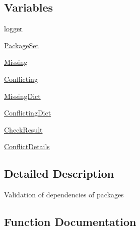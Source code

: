 \subsection*{Variables}
\begin{DoxyCompactItemize}
\item 
\hyperlink{namespacepip_1_1__internal_1_1operations_1_1check_ae884318312138e6f7ab45bd1d45180d7}{logger}
\item 
\hyperlink{namespacepip_1_1__internal_1_1operations_1_1check_a772274a200eddcd0a3574e45e825c1e4}{Package\+Set}
\item 
\hyperlink{namespacepip_1_1__internal_1_1operations_1_1check_aca51bd22558103df3ace175abcb0e024}{Missing}
\item 
\hyperlink{namespacepip_1_1__internal_1_1operations_1_1check_a6e1d711030dfddbacc38304bfc8ef87a}{Conflicting}
\item 
\hyperlink{namespacepip_1_1__internal_1_1operations_1_1check_a36e097c8c839760cdb999e39b799944c}{Missing\+Dict}
\item 
\hyperlink{namespacepip_1_1__internal_1_1operations_1_1check_a5b777bebebaee1d9c6751c1b639b72f4}{Conflicting\+Dict}
\item 
\hyperlink{namespacepip_1_1__internal_1_1operations_1_1check_acd52e1ca33b255f0f9a8b19883a9c7f4}{Check\+Result}
\item 
\hyperlink{namespacepip_1_1__internal_1_1operations_1_1check_a83b303238632b9b573cd69697b9a45e3}{Conflict\+Details}
\end{DoxyCompactItemize}


\subsection{Detailed Description}
\begin{DoxyVerb}Validation of dependencies of packages
\end{DoxyVerb}
 

\subsection{Function Documentation}
\mbox{\label{namespacepip_1_1__internal_1_1operations_1_1check_a872c01627dab38f37f73bcbf182260f2}} 
